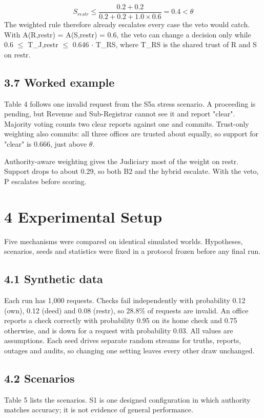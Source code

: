\documentclass[10pt]{article}
\begin{document}
\[ S_{restr} \le \frac{0.2 + 0.2}{0.2 + 0.2 + 1.0 \times 0.6} = 0.4 < \theta \]
The weighted rule therefore already escalates every case the veto would catch. With A(R,restr) = A(S,restr) = 0.6, the veto can change a decision only while 0.6 $\leq$ T\_J,restr $\leq$ 0.646 $\cdot$ T\_RS, where T\_RS is the shared trust of R and S on restr.

\subsection*{3.7 Worked example}
Table 4 follows one invalid request from the S5a stress scenario. A proceeding is pending, but Revenue and Sub-Registrar cannot see it and report "clear". Majority voting counts two clear reports against one and commits. Trust-only weighting also commits: all three offices are trusted about equally, so support for "clear" is 0.666, just above $\theta$.

Authority-aware weighting gives the Judiciary most of the weight on restr. Support drops to about 0.29, so both B2 and the hybrid escalate. With the veto, P escalates before scoring.


\section*{4 Experimental Setup}
Five mechanisms were compared on identical simulated worlds. Hypotheses, scenarios, seeds and statistics were fixed in a protocol frozen before any final run.

\subsection*{4.1 Synthetic data}
Each run has 1,000 requests. Checks fail independently with probability 0.12 (own), 0.12 (deed) and 0.08 (restr), so 28.8\% of requests are invalid. An office reports a check correctly with probability 0.95 on its home check and 0.75 otherwise, and is down for a request with probability 0.03. All values are assumptions. Each seed drives separate random streams for truths, reports, outages and audits, so changing one setting leaves every other draw unchanged.

\subsection*{4.2 Scenarios}
Table 5 lists the scenarios. S1 is one designed configuration in which authority matches accuracy; it is not evidence of general performance.
\end{document}
